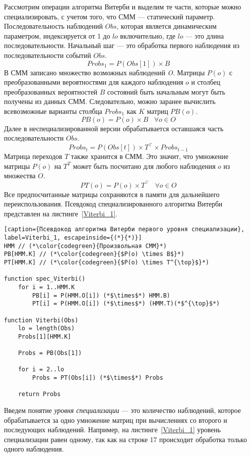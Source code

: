 Рассмотрим операции алгоритма Витерби и выделим те части, которые можно специализировать, с учетом того, что 
СММ --- статический параметр.
Последовательность наблюдений $Obs$, которая является 
динамическим параметром, индексируется от 1 до $lo$ 
включительно, где $lo$ --- это длина последовательности.
Начальный шаг --- это обработка первого наблюдения из 
последовательности событий $Obs$.
\[Probs_{1} = P(Obs[1]) \times B\]
В СММ записано множество возможных наблюдений \emph{O}.
Матрицы $P(o)$ с преобразованными вероятностями для каждого 
наблюдения $o$ и столбец преобразованных вероятностей 
$B$ состояний быть начальным могут быть
получены из данных СММ.
Следовательно, можно заранее вычислить всевозможные варианты 
столбца $Probs_{1}$ как $K$ матриц $PB(o)$. 
\[PB(o) = P(o) \times B \;\;\; \forall o \in O\]
Далее в неспециализированной версии обрабатывается оставшаяся 
часть последовательности $Obs$.
\[Probs_{t} = P(Obs[t]) \times T^{\top} \times Probs_{t - 1}\]
Матрица переходов $T$ также хранится в СММ.
Это значит, что умножение матрицы $P(o)$ на $T^{T}$ 
может быть посчитано для любого наблюдения $o$ из множества $O$.
\[PT(o) = P(o) \times T^{\top} \;\;\; \forall o \in O\]
Все предпосчитанные матрицы сохраняются в памяти для 
дальнейшего переиспользования.
Псевдокод специализированного алгоритма Витерби представлен 
на листинге~\ref{Viterbi_1}.
\begin{lstlisting}[caption={Псевдокод алгоритма Витерби первого уровня специализации}, label=Viterbi_1, escapeinside={(*}{*)}]
HMM // (*\color{codegreen}{Произвольная СММ}*)
PB[HMM.K] // (*\color{codegreen}{$P(o) \times B$}*)
PT[HMM.K] // (*\color{codegreen}{$P(o) \times T^{\top}$}*)

function spec_Viterbi()
	for i = 1..HMM.K
		PB[i] = P(HMM.O[i]) (*$\times$*) HMM.B)
		PT[i] = P(HMM.O[i]) (*$\times$*) (HMM.T)(*$^{\top}$*)

function Viterbi(Obs)
	lo = length(Obs)
	Probs[1][HMM.K]

	Probs = PB(Obs[1])
	
	for i = 2..lo
		Probs = PT(Obs[i]) (*$\times$*) Probs
		
	return Probs
\end{lstlisting}

Введем понятие \emph{уровня специализации} --- это количество 
наблюдений, которое обрабатывается за одно умножение матриц 
при вычислениях со второго и последующих наблюдений.
Например, на листинге~\ref{Viterbi_1} уровень специализации 
равен одному, так как на строке 17 происходит обработка 
только одного наблюдения.

